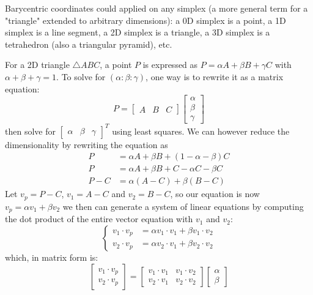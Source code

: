\documentclass[12pt]{report}
\begin{document}
		Barycentric coordinates could applied on any simplex (a more general term for a "triangle" extended to arbitrary dimensions): a 0D simplex is a point, a 1D simplex is a line segment, a 2D simplex is a triangle, a 3D simplex is a tetrahedron (also a triangular pyramid), etc.
		
		For a 2D triangle $\triangle ABC$, a point $P$ is expressed as $P = \alpha A + \beta B + \gamma C$ with $\alpha + \beta + \gamma = 1$. To solve for $(\alpha : \beta : \gamma)$, one way is to rewrite it as a matrix equation:
	$$
	P = 
	\begin{bmatrix}
	A & B & C
	\end{bmatrix}
	\begin{bmatrix}
	\alpha \\ \beta \\ \gamma
	\end{bmatrix}
	$$
	then solve for $\begin{bmatrix}\alpha & \beta & \gamma\end{bmatrix}^T$ using least squares. We can however reduce the dimensionality by rewriting the equation as
	\begin{align*}
	P &= \alpha A + \beta B + (1 - \alpha - \beta) C\\
	P &= \alpha A + \beta B + C - \alpha C - \beta C\\
	P - C &= \alpha (A - C) + \beta (B - C)
	\end{align*}
	Let $v_p = P - C$, $v_1 = A - C$ and $v_2 = B - C$, so our equation is now $v_p = \alpha v_1 + \beta v_2$ we then can generate a system of linear equations by computing the dot product of the entire vector equation with $v_1$ and $v_2$:
	$$
	\begin{cases}
	v_1 \cdot v_p &= \alpha v_1 \cdot v_1 + \beta v_1 \cdot v_2 \\
	v_2 \cdot v_p &= \alpha v_2 \cdot v_1 + \beta v_2 \cdot v_2
	\end{cases}
	$$
	which, in matrix form is:
	$$
	\begin{bmatrix}
	v_1 \cdot v_p \\
	v_2 \cdot v_p
	\end{bmatrix}
	= 
	\begin{bmatrix}
	v_1 \cdot v_1 & v_1 \cdot v_2\\
	v_2 \cdot v_1 & v_2 \cdot v_2
	\end{bmatrix}
	\begin{bmatrix}
	\alpha \\ \beta
	\end{bmatrix}
	$$
\end{document}
